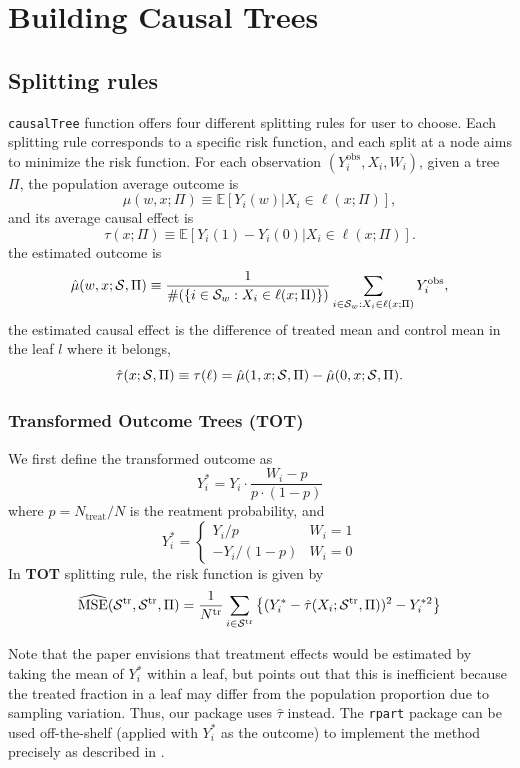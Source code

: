 \documentclass[11pt]{article}
\newcommand{\calp}{{\Pi}}
\newcommand{\cals}{{\cal S}}
\newcommand{\mse}{{\rm MSE}}
\newcommand{\train}{{\rm tr}}
\newcommand{\obs}{{\rm obs}}
\newcommand{\mme}{\mathbb{E}}
\begin{document}
\section{Building Causal Trees}
\subsection{Splitting rules}
\texttt{causalTree} function offers four different splitting rules for user to choose. Each splitting rule corresponds to a specific risk function, and each split at a node aims to minimize the risk function. For each observation $(Y_i^{\text{obs}}, X_i, W_i)$, given a tree $\calp$, the population average outcome is
\[\mu(w,x;\calp) \equiv \mme\left[\left. Y_i(w) \right| X_i\in\ell(x;\calp) \right], \]
and its average causal effect is
\[\tau(x;\Pi) \equiv \mme\left[\left. Y_i(1)-Y_i(0) \right| X_i\in\ell(x;\calp) \right]. \]
the estimated outcome is
\[ \hat\mu(w,x;\cals,\calp) \equiv
\frac{1}{\#(\{i\in\cals_w:X_i\in\ell(x;\calp)\})}\sum_{i\in\cals_w:X_i\in\ell(x;\calp)} Y_i^\obs,\]
the estimated causal effect is the difference of treated mean and control mean in the leaf $l$ where it belongs,
\[ \hat\tau(x;\cals,\calp) \equiv \tau(\ell) =  \hat\mu(1,x;\cals,\calp)- \hat\mu(0,x;\cals,\calp).\]

\subsubsection{Transformed Outcome Trees (\textbf{TOT})}
We first define the transformed outcome as
\[ Y_i^* = Y_i \cdot \frac{W_i - p}{p\cdot(1 - p)}\]
where $p = N_{\text{treat}} / N$ is the reatment probability, and
\[ Y^*_i = \begin{cases}
     Y_i/p & W_i = 1 \\
      -Y_i/(1 - p) & W_i = 0
   \end{cases}
\]
In \textbf{TOT} splitting rule, the risk function is given by
\[\widehat{\mse}(\cals^\train, \cals^\train, \Pi) = \frac{1}{N^\train}\sum_{i\in\cals^\train}\left\{(Y^*_i - \hat{\tau}(X_i; \cals^\train, \calp))^2  - Y^{*2}_i\right\}\]

Note that the paper \cite{athey2015machine} envisions that treatment effects would be estimated by taking the mean of
$Y_i^*$ within a leaf, but points out that this is inefficient because the treated fraction in a leaf may differ from the population
proportion due to sampling variation.  Thus, our package uses $\hat\tau$ instead.  The \texttt{rpart} package can be
used off-the-shelf (applied with $Y^*_i$ as the outcome) to implement the method precisely as described in \cite{athey2015machine}.
\end{document}
